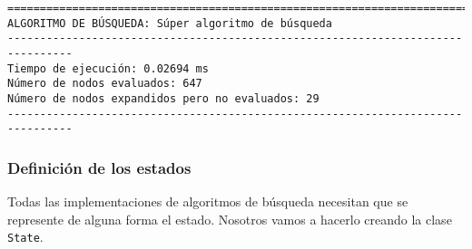 \documentclass[11pt]{article}
\begin{document}
    \begin{Verbatim}[commandchars=\\\{\}]
================================================================================
ALGORITMO DE BÚSQUEDA: Súper algoritmo de búsqueda
--------------------------------------------------------------------------------
Tiempo de ejecución: 0.02694 ms
Número de nodos evaluados: 647
Número de nodos expandidos pero no evaluados: 29
--------------------------------------------------------------------------------

    \end{Verbatim}

    \hypertarget{definiciuxf3n-de-los-estados}{%
\subsubsection{Definición de los
estados}\label{definiciuxf3n-de-los-estados}}

Todas las implementaciones de algoritmos de búsqueda necesitan que se
represente de alguna forma el estado. Nosotros vamos a hacerlo creando
la clase \texttt{State}.
\end{document}
